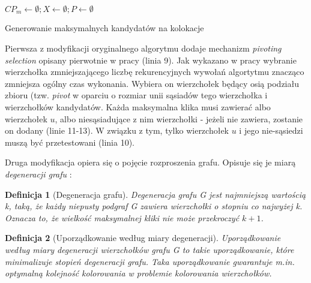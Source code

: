 \documentclass[12pt]{article}
\newtheorem{defin}{Definicja}
\begin{document}
\begin{algorithm}
$CP_{m} \leftarrow \emptyset; X \leftarrow \emptyset; P \leftarrow \emptyset$\;

\caption{Generowanie maksymalnych kandydatów na kolokacje}
\end{algorithm}

Pierwsza z modyfikacji oryginalnego algorytmu dodaje mechanizm \textit{pivoting selection} opisany pierwotnie w pracy \cite{pivot} (linia 9). Jak wykazano w pracy \cite{pivot2} wybranie wierzchołka zmniejszającego liczbę rekurencyjnych wywołań algortytmu znacząco zmniejsza ogólny czas wykonania. Wybiera on wierzchołek będący osią podziału zbioru (tzw. \textit{pivot} w oparciu o rozmiar unii sąsiadów tego wierzchołka i wierzchołków kandydatów. Każda maksymalna klika musi zawierać albo wierzchołek $ u $, albo niesąsiadujące z nim wierzchołki - jeżeli nie zawiera, zostanie on dodany (linie 11-13). W związku z tym, tylko wierzchołek $ u $ i jego nie-sąsiedzi muszą być przetestowani (linia 10).
\newline

Druga modyfikacja opiera się o pojęcie rozproszenia grafu. Opisuje się je miarą \textit{degeneracji grafu} \cite{matusiak}:
\begin{defin}[Degeneracja grafu]
Degeneracja grafu G jest najmniejszą wartością k, taką, że każdy niepusty podgraf G zawiera wierzchołki o stopniu co najwyżej k. Oznacza to, że wielkość maksymalnej kliki nie może przekroczyć $k + 1$.
\end{defin}

\begin{defin}[Uporządkowanie według miary degeneracji]
Uporządkowanie według miary degeneracji wierzchołków grafu G to takie uporządkowanie, które minimalizuje stopień degeneracji grafu. Taka uporządkowanie gwarantuje m.in. optymalną kolejność kolorowania w problemie kolorowania wierzchołków.
\end{defin}
\end{document}
